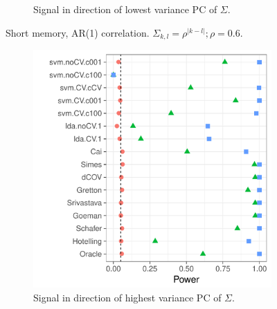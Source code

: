 \documentclass[]{bio}
\begin{document}
\begin{figure}[h]
\begin{subfigure}[t]{.45\columnwidth}
		\caption{Signal in direction of lowest variance PC of $\Sigma$.} 
		\label{fig:dependence_12}
	\end{subfigure}
	\caption{Short memory, AR(1) correlation. 
		$\Sigma_{k,l}=\rho^{|k-l|}; \rho=0.6$.}
	\label{fig:dependence_1}
\end{figure}


\begin{figure}[h]
	\centering
	\begin{subfigure}[t]{.45\columnwidth}
		\centering
		\includegraphics[width=1\columnwidth]{"art/file22"}
		\caption{Signal in direction of highest variance PC of $\Sigma$.} 
		\label{fig:dependence_21}
	\end{subfigure}
	\begin{subfigure}[t]{.45\columnwidth}
		\centering

\end{subfigure}
\end{figure}
\end{document}
